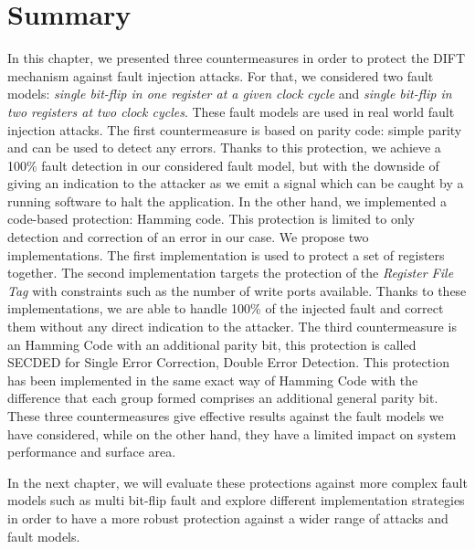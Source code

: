 \section{Summary}
In this chapter, we presented three countermeasures in order to protect the DIFT mechanism against fault injection attacks. For that, we considered two fault models: \textit{single bit-flip in one register at a given clock cycle} and \textit{single bit-flip in two registers at two clock cycles}. These fault models are used in real world fault injection attacks.
The first countermeasure is based on parity code: simple parity and can be used to detect any errors. Thanks to this protection, we achieve a 100\% fault detection in our considered fault model, but with the downside of giving an indication to the attacker as we emit a signal which can be caught by a running software to halt the application.
In the other hand, we implemented a code-based protection: Hamming code. This protection is limited to only detection and correction of an error in our case. We propose two implementations. The first implementation is used to protect a set of registers together. The second implementation targets the protection of the \textit{Register File Tag} with constraints such as the number of write ports available. Thanks to these implementations, we are able to handle 100\% of the injected fault and correct them without any direct indication to the attacker.
The third countermeasure is an Hamming Code with an additional parity bit, this protection is called SECDED for Single Error Correction, Double Error Detection. This protection has been implemented in the same exact way of Hamming Code with the difference that each group formed comprises an additional general parity bit.
These three countermeasures give effective results against the fault models we have considered, while on the other hand, they have a limited impact on system performance and surface area.

In the next chapter, we will evaluate these protections against more complex fault models such as multi bit-flip fault and explore different implementation strategies in order to have a more robust protection against a wider range of attacks and fault models.

